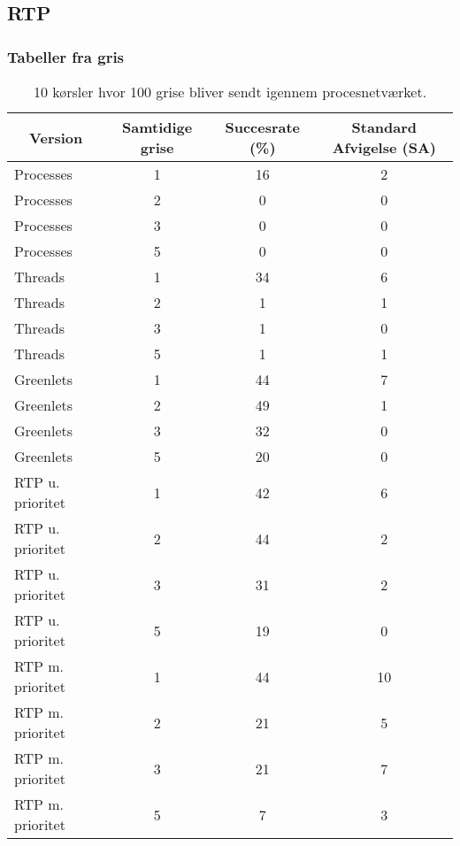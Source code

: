 \documentclass[12pt]{beamer}
\newcommand\mc[1]{\multicolumn{1}{c}{\textbf {#1}}} %
\begin{document}
\subsection{RTP}
\begin{frame}
  \frametitle{Tabeller fra gris}
\tiny 
\begin{table}[htbp]
	\centering
	\begin{tabular}{lccc}
       	\toprule
        \mc{Version}  &\mc{Samtidige grise} & \mc{Succesrate (\%)} & \mc{Standard Afvigelse (SA)} \\
        \midrule
        Processes        & 1 & 16 & 2 \\
        Processes        & 2 &  0 & 0 \\
        Processes        & 3 &  0 & 0 \\
        Processes        & 5 &  0 & 0\\
        \midrule
        Threads          & 1 & 34 & 6 \\
        Threads          & 2 &  1 & 1 \\
        Threads          & 3 &  1 & 0 \\
        Threads          & 5 &  1 & 1 \\
        \midrule
        Greenlets        & 1 & 44 & 7 \\
        Greenlets        & 2 & 49 & 1 \\
        Greenlets        & 3 & 32 & 0\\
        Greenlets        & 5 & 20 & 0 \\
        \midrule
        RTP u. prioritet & 1 & 42 & 6 \\
        RTP u. prioritet & 2 & 44 & 2 \\
        RTP u. prioritet & 3 & 31 & 2 \\
        RTP u. prioritet & 5 & 19 & 0 \\
        \midrule
        RTP m. prioritet & 1 & 44 & 10\\
        RTP m. prioritet & 2 & 21 & 5\\
        RTP m. prioritet & 3 & 21 & 7\\
        RTP m. prioritet & 5 &  7 & 3\\
 
        \bottomrule
    \end{tabular}
	\caption[]{\tiny 10 kørsler hvor 100 grise bliver sendt igennem procesnetværket. }
\end{table}
\end{frame}
\end{document}

